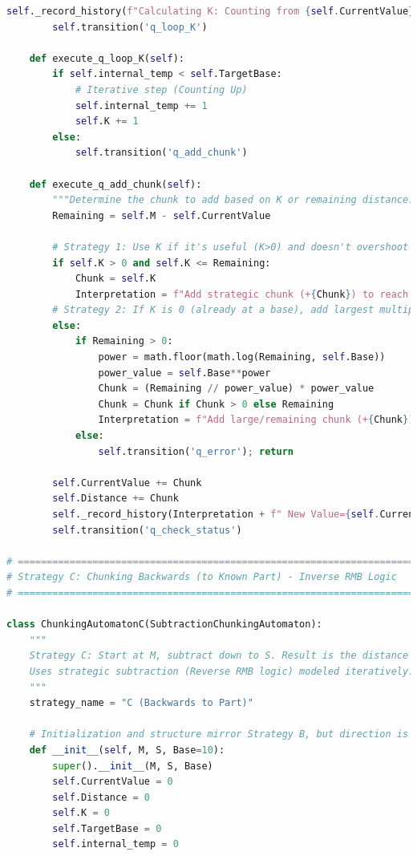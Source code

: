 \documentclass[11pt]{article}
\begin{document}
\begin{lstlisting}[language=Python]
        self._record_history(f"Calculating K: Counting from {self.CurrentValue} to {self.TargetBase}.", CV=self.CurrentValue, Dist=self.Distance, K=0)
        self.transition('q_loop_K')

    def execute_q_loop_K(self):
        if self.internal_temp < self.TargetBase:
            # Iterative step (Counting Up)
            self.internal_temp += 1
            self.K += 1
        else:
            self.transition('q_add_chunk')

    def execute_q_add_chunk(self):
        """Determine the chunk to add based on K or remaining distance."""
        Remaining = self.M - self.CurrentValue

        # Strategy 1: Use K if it's useful (K>0) and doesn't overshoot
        if self.K > 0 and self.K <= Remaining:
            Chunk = self.K
            Interpretation = f"Add strategic chunk (+{Chunk}) to reach base."
        # Strategy 2: If K is 0 (already at a base), add largest multiple of power of base possible.
        else:
            if Remaining > 0:
                power = math.floor(math.log(Remaining, self.Base))
                power_value = self.Base**power
                Chunk = (Remaining // power_value) * power_value
                Chunk = Chunk if Chunk > 0 else Remaining
                Interpretation = f"Add large/remaining chunk (+{Chunk})."
            else:
                self.transition('q_error'); return

        self.CurrentValue += Chunk
        self.Distance += Chunk
        self._record_history(Interpretation + f" New Value={self.CurrentValue}.", CV=self.CurrentValue, Dist=self.Distance, K=self.K)
        self.transition('q_check_status')

# =============================================================================
# Strategy C: Chunking Backwards (to Known Part) - Inverse RMB Logic
# =============================================================================

class ChunkingAutomatonC(SubtractionChunkingAutomaton):
    """
    Strategy C: Start at M, subtract down to S. Result is the distance traveled.
    Uses strategic subtraction (Reverse RMB logic) modeled iteratively.
    """
    strategy_name = "C (Backwards to Part)"

    # Initialization and structure mirror Strategy B, but direction is reversed.
    def __init__(self, M, S, Base=10):
        super().__init__(M, S, Base)
        self.CurrentValue = 0
        self.Distance = 0
        self.K = 0
        self.TargetBase = 0
        self.internal_temp = 0


\end{lstlisting}
\end{document}
